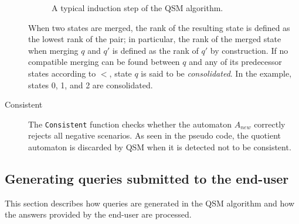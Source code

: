 \begin{description}
\begin{figure}[H]
\hspace*{-1cm}
\begin{center}
\end{center}
\caption{A typical induction step of the \textsc{QSM} algorithm\label{Fig:algo:steps}.}
\end{figure}

When two states are merged, the rank of the resulting state is defined as the lowest rank of the pair; in particular, the rank of the merged state when merging $q$ and $q'$ is defined as the rank of $q'$ by construction. If no compatible merging can be found between $q$ and any of its predecessor states according to $<$, state $q$ is said to be \textsl{consolidated}. In the example, states 0, 1, and 2 are consolidated.

\item[Consistent] The \texttt{Consistent} function checks whether the automaton $A_{new}$ correctly rejects all negative scenarios. As seen in the pseudo code, the quotient automaton is discarded by \textsc{QSM} when it is detected not to be consistent.

\end{description}

\subsection{Generating queries submitted to the end-user\label{QSM:query}}

This section describes how queries are generated in the \textsc{QSM} algorithm and how the answers provided by the end-user are processed.

